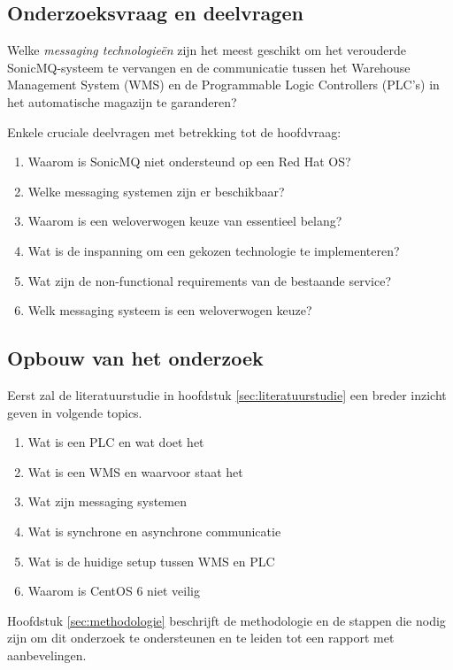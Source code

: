 \newpage

\subsection{Onderzoeksvraag en deelvragen}
Welke \emph{messaging technologieën} zijn het meest geschikt om het verouderde SonicMQ-systeem te vervangen 
en de communicatie tussen het Warehouse Management System (WMS) en de Programmable Logic Controllers (PLC’s) 
in het automatische magazijn te garanderen?

Enkele cruciale deelvragen met betrekking tot de hoofdvraag:
\begin{enumerate}
  \item Waarom is SonicMQ niet ondersteund op een Red Hat OS?
  \item Welke messaging systemen zijn er beschikbaar?
  \item Waarom is een weloverwogen keuze van essentieel belang?
  \item Wat is de inspanning om een gekozen technologie te implementeren?
  \item Wat zijn de non-functional requirements van de bestaande service?
  \item Welk messaging systeem is een weloverwogen keuze?
\end{enumerate}

\subsection{Opbouw van het onderzoek}
Eerst zal de literatuurstudie in hoofdstuk \ref{sec:literatuurstudie} een breder inzicht geven in volgende topics.
\begin{enumerate}
  \item Wat is een PLC en wat doet het
  \item Wat is een WMS en waarvoor staat het
  \item Wat zijn messaging systemen
  \item Wat is synchrone en asynchrone communicatie
  \item Wat is de huidige setup tussen WMS en PLC
  \item Waarom is CentOS 6 niet veilig
\end{enumerate}

Hoofdstuk \ref{sec:methodologie} beschrijft de methodologie en de stappen die nodig zijn om dit onderzoek te ondersteunen
en te leiden tot een rapport met aanbevelingen.
\newline

